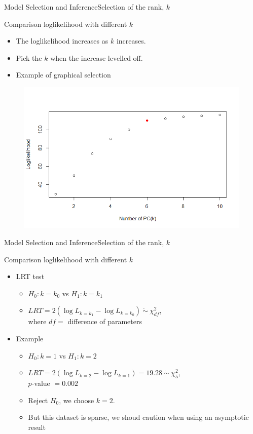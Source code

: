 \documentclass{beamer}
\begin{document}
\begin{frame}{Model Selection and Inference}{Selection of the rank, $k$}
	\begin{block}{Comparison loglikelihood with different $k$}
		\begin{itemize}
			\item {
				The loglikelihood increases as $k$ increases.
			}
			\item {
				Pick the $k$ when the increase levelled off.
			}
			\item {
				Example of graphical selection
			}
		\end{itemize}
		\begin{figure}[h] %
			\begin{center}
				\includegraphics[width=0.6\linewidth]{img/9.png}
			\end{center}
			\label{fig:long}
			\label{fig:onecol}
		\end{figure}
	\end{block}
\end{frame}

\begin{frame}{Model Selection and Inference}{Selection of the rank, $k$}
	\begin{block}{Comparison loglikelihood with different $k$}
		\begin{itemize}
			\item {
				LRT test
			}
			\begin{itemize}
				\item {
					$H_0:k=k_0$ vs $H_1:k=k_1$
				}
				\item {
					$LRT = 2(\log L_{k=k_1} - \log L_{k=k_0}) \ \dot\sim \ \chi^2_{df}$, \\where $df=$ difference of parameters
				}
			\end{itemize}
			\item {
				Example
			}
			\begin{itemize}
				\item {
					$H_0:k=1$ vs $H_1:k=2$
				}
				\item {
					$LRT = 2(\log L_{k=2} - \log L_{k=1}) = 19.28 \ \dot\sim \ \chi^2_5$,\\
					$p$-value $=0.002$
				}
				\item {
					Reject $H_0$, we choose $k=2$.
				}
				\item {
					But this dataset is sparse, we shoud caution when using an asymptotic result
				}
			\end{itemize}
		\end{itemize}
	\end{block}\
\end{frame}
\end{document}
